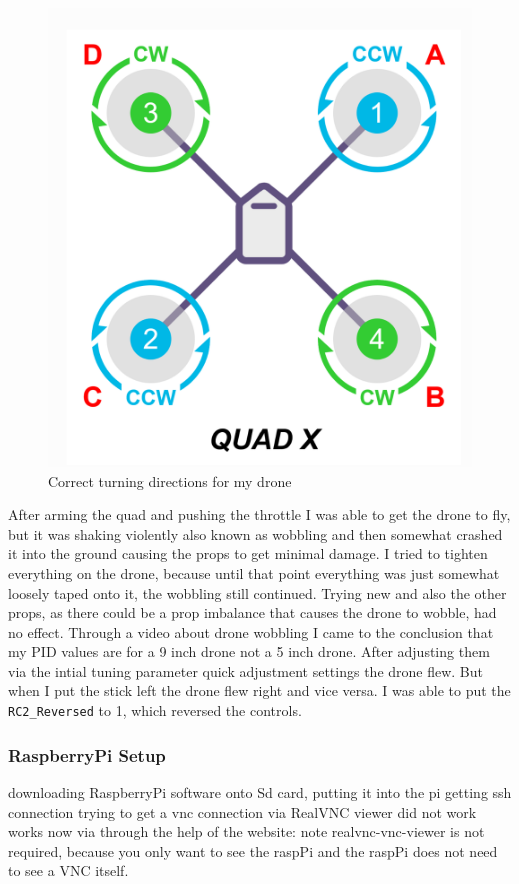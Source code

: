 \documentclass{article}
\begin{document}
\begin{figure}[h]
	\centering
	\includegraphics[scale=0.4]{pictures/quadx}
	\caption{Correct turning directions for my drone}
	\label{fig:quadx}
\end{figure}

	After arming the quad and pushing the throttle I was able to get the drone to fly, but it was shaking violently also known as wobbling and then somewhat crashed it into the ground causing the props to get minimal damage. I tried to tighten everything on the drone, because until that point everything was just somewhat loosely taped onto it, the wobbling still continued. Trying new and also the other props, as there could be a prop imbalance that causes the drone to wobble, had no effect. Through a video\cite{dronewobblevideo} about drone wobbling I came to the conclusion that my PID values are for a 9 inch drone not a 5 inch drone. 
	After adjusting them via the intial tuning parameter quick adjustment settings the drone flew. But when I put the stick left the drone flew right and vice versa. I was able to put the \lstinline|RC2_Reversed| to 1, which reversed the controls. 
	
	\subsubsection{RaspberryPi Setup}
	downloading RaspberryPi software onto Sd card, putting it into the pi
	getting ssh connection
	trying to get a vnc connection via RealVNC viewer did not work
	works now via through the help of the website: \cite{ionisvnctutorial} 
	note realvnc-vnc-viewer is not required, because you only want to see the raspPi and the raspPi does not need to see a VNC itself.
\end{document}
